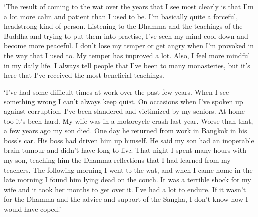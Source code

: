 `The result of coming to the wat over the years that I see most clearly
is that I'm a lot more calm and patient than I used to be. I'm
basically quite a forceful, headstrong kind of person. Listening to the
Dhamma and the teachings of the Buddha and trying to put them into
practise, I've seen my mind cool down and become more peaceful. I don't
lose my temper or get angry when I'm provoked in the way that I used to. 
My temper has improved a lot. Also, I feel more mindful in my daily
life. I always tell people that I've been to many monasteries, but it's
here that I've received the most beneficial teachings. 

`I've had some difficult times at work over the past few years. When I
see something wrong I can't always keep quiet. On occasions when I've
spoken up against corruption, I've been slandered and victimized by my
seniors. At home too it's been hard. My wife was in a motorcycle crash
last year. Worse than that, a few years ago my son died. One day he
returned from work in Bangkok in his boss's car. His boss had driven him
up himself. He said my son had an inoperable brain tumour and didn't
have long to live. That night I spent many hours with my son, teaching
him the Dhamma reflections that I had learned from my teachers. The
following morning I went to the wat, and when I came home in the late
morning I found him lying dead on the couch. It was a terrible shock for
my wife and it took her months to get over it. I've had a lot to endure. 
If it wasn't for the Dhamma and the advice and support of the Sangha, I
don't know how I would have coped.'

